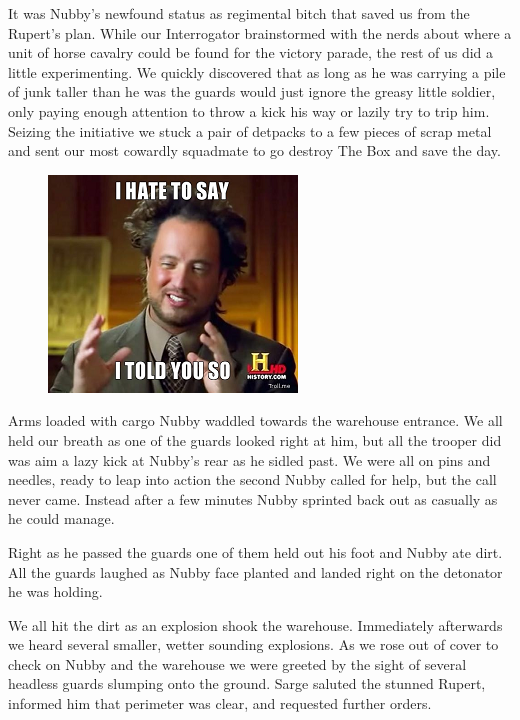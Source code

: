 It was Nubby's newfound status as regimental bitch that saved us from the Rupert's plan. 
While our Interrogator brainstormed with the nerds about where a unit of horse cavalry could be found for the victory parade, the rest of us did a little experimenting. 
We quickly discovered that as long as he was carrying a pile of junk taller than he was the guards would just ignore the greasy little soldier, only paying enough attention to throw a kick his way or lazily try to trip him. 
Seizing the initiative we stuck a pair of detpacks to a few pieces of scrap metal and sent our most cowardly squadmate to go destroy The Box and save the day.

\begin{figure}
	\begin{center}
		\includegraphics[width=\figwidth]{pics/4/26.png}
	\end{center}
\end{figure}
Arms loaded with cargo Nubby waddled towards the warehouse entrance.
We all held our breath as one of the guards looked right at him, but all the trooper did was aim a lazy kick at Nubby's rear as he sidled past. 
We were all on pins and needles, ready to leap into action the second Nubby called for help, but the call never came. 
Instead after a few minutes Nubby sprinted back out as casually as he could manage. 

Right as he passed the guards one of them held out his foot and Nubby ate dirt. 
All the guards laughed as Nubby face planted and landed right on the detonator he was holding.

We all hit the dirt as an explosion shook the warehouse. 
Immediately afterwards we heard several smaller, wetter sounding explosions. 
As we rose out of cover to check on Nubby and the warehouse we were greeted by the sight of several headless guards slumping onto the ground. 
Sarge saluted the stunned Rupert, informed him that perimeter was clear, and requested further orders.

